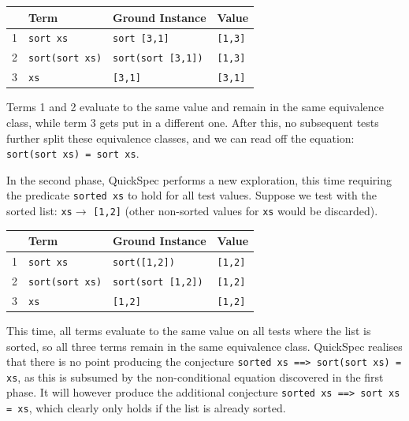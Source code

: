 \begin{tabularx}{\textwidth}{l  X  X  X}
 & Term & Ground Instance & Value \\
 \hline
1 \quad &\texttt{sort xs} & \texttt{sort [3,1]} & \texttt{[1,3]} \\
2 \quad&\texttt{sort(sort xs)} &\texttt{sort(sort [3,1])} & \texttt{[1,3]}\\  
3 \quad &\texttt{xs} &\texttt{[3,1]} & \texttt{[3,1]} \\
\end{tabularx}

\noindent Terms 1 and 2 evaluate to the same value and remain in the same equivalence class, while term 3 gets put in a different one. After this, no subsequent tests further split these equivalence classes, and we can read off the equation: \texttt{sort(sort xs) = sort xs}.  

In the second phase, QuickSpec performs a new exploration, this time requiring the predicate \texttt{sorted xs} to hold for all test values. Suppose we test with the sorted list: \texttt{xs}$ \rightarrow$ \texttt{[1,2]} (other non-sorted values for \texttt{xs} would be discarded).       

\begin{tabularx}{\textwidth}{l  X  X  X}
 & Term & Ground Instance & Value \\
 \hline
1 \quad &\texttt{sort xs} & \texttt{sort([1,2])} & \texttt{[1,2]} \\
2 \quad&\texttt{sort(sort xs)} &\texttt{sort(sort [1,2])} & \texttt{[1,2]}\\
3 \quad &\texttt{xs} &\texttt{[1,2]} & \texttt{[1,2]} \\
\end{tabularx}

\noindent This time, all terms evaluate to the same value on all tests where the list is sorted, so all three terms remain in the same equivalence class. QuickSpec realises that there is no point producing the conjecture \texttt{sorted xs ==> sort(sort xs) = xs}, as this is subsumed by the non-conditional equation discovered in the first phase. It will however produce the additional conjecture \texttt{sorted xs ==> sort xs = xs}, which clearly only holds if the list is already sorted.

